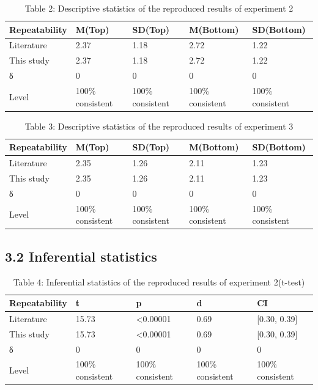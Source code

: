 \documentclass[
  man,floatsintext]{apa6}
\begin{document}
\begin{longtable}[t]{lllll}
\caption{\label{tab:unnamed-chunk-3}Table 2: Descriptive statistics of the reproduced results of experiment 2}\\
\toprule
Repeatability & M(Top) & SD(Top) & M(Bottom) & SD(Bottom)\\
\midrule
Literature & 2.37 & 1.18 & 2.72 & 1.22\\
This study & 2.37 & 1.18 & 2.72 & 1.22\\
δ & 0 & 0 & 0 & 0\\
Level & 100\% consistent & 100\% consistent & 100\% consistent & 100\% consistent\\
\bottomrule
\end{longtable}

\begin{longtable}[t]{lllll}
\caption{\label{tab:unnamed-chunk-4}Table 3: Descriptive statistics of the reproduced results of experiment 3}\\
\toprule
Repeatability & M(Top) & SD(Top) & M(Bottom) & SD(Bottom)\\
\midrule
Literature & 2.35 & 1.26 & 2.11 & 1.23\\
This study & 2.35 & 1.26 & 2.11 & 1.23\\
δ & 0 & 0 & 0 & 0\\
Level & 100\% consistent & 100\% consistent & 100\% consistent & 100\% consistent\\
\bottomrule
\end{longtable}

\subsection{3.2 Inferential statistics}\label{inferential-statistics}

\begin{longtable}[t]{lllll}
\caption{\label{tab:unnamed-chunk-5}Table 4: Inferential statistics of the reproduced results of experiment 2(t-test)}\\
\toprule
Repeatability & t & p & d & CI\\
\midrule
Literature & 15.73 & <0.00001 & 0.69 & {}[0.30, 0.39]\\
This study & 15.73 & <0.00001 & 0.69 & {}[0.30, 0.39]\\
δ & 0 & 0 & 0 & 0\\
Level & 100\% consistent & 100\% consistent & 100\% consistent & 100\% consistent\\
\bottomrule
\end{longtable}
\end{document}
